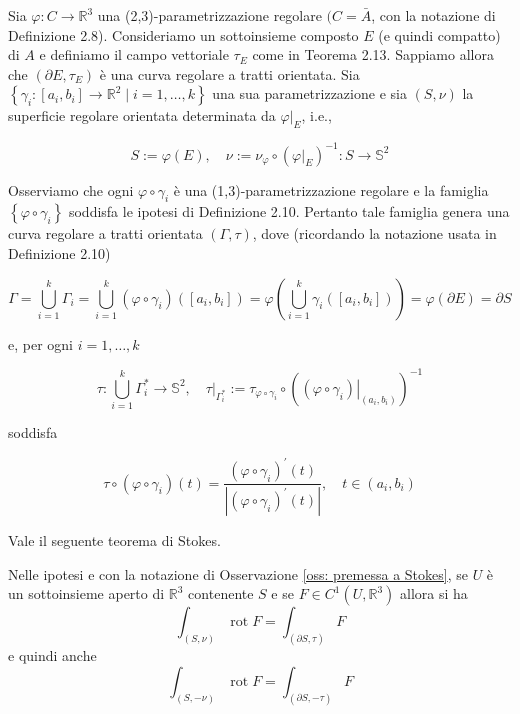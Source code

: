 \begin{oss}\label{oss: premessa a Stokes}
    Sia $\varphi: C \rightarrow \mathbb{R}^{3}$ una (2,3)-parametrizzazione regolare $(C=\bar{A}$, con la notazione di Definizione 2.8). Consideriamo un sottoinsieme composto $E$ (e quindi compatto) di $A$ e definiamo il campo vettoriale $\tau_{E}$ come in Teorema 2.13. Sappiamo allora che $\left(\partial E, \tau_{E}\right)$ è una curva regolare a tratti orientata. Sia $\left\{\gamma_{i}:\left[a_{i}, b_{i}\right] \rightarrow \mathbb{R}^{2} \mid i=1, \ldots, k\right\}$ una sua parametrizzazione e sia $(S, \nu)$ la superficie regolare orientata determinata da $\left.\varphi\right|_{E}$, i.e.,

    \[
    S:=\varphi(E), \quad \nu:=\nu_{\varphi} \circ\left(\left.\varphi\right|_{E}\right)^{-1}: S \rightarrow \mathbb{S}^{2}
    \]

    Osserviamo che ogni $\varphi \circ \gamma_{i}$ è una (1,3)-parametrizzazione regolare e la famiglia $\left\{\varphi \circ \gamma_{i}\right\}$ soddisfa le ipotesi di Definizione 2.10. Pertanto tale famiglia genera una curva regolare a tratti orientata $(\Gamma, \tau)$, dove (ricordando la notazione usata in Definizione 2.10)

    \[
    \Gamma=\bigcup_{i=1}^{k} \Gamma_{i}=\bigcup_{i=1}^{k}\left(\varphi \circ \gamma_{i}\right)\left(\left[a_{i}, b_{i}\right]\right)=\varphi\left(\bigcup_{i=1}^{k} \gamma_{i}\left(\left[a_{i}, b_{i}\right]\right)\right)=\varphi(\partial E)=\partial S
    \]

    e, per ogni $i=1, \ldots, k$

    \[
    \tau: \bigcup_{i=1}^{k} \Gamma_{i}^{*} \rightarrow \mathbb{S}^{2},\left.\quad \tau\right|_{\Gamma_{i}^{*}}:=\tau_{\varphi \circ \gamma_{i}} \circ\left(\left.\left(\varphi \circ \gamma_{i}\right)\right|_{\left(a_{i}, b_{i}\right)}\right)^{-1}
    \]

    soddisfa

    \[
    \tau \circ\left(\varphi \circ \gamma_{i}\right)(t)=\frac{\left(\varphi \circ \gamma_{i}\right)^{\prime}(t)}{\left|\left(\varphi \circ \gamma_{i}\right)^{\prime}(t)\right|}, \quad t \in\left(a_{i}, b_{i}\right)
    \]
\end{oss}

Vale il seguente teorema di Stokes.

\begin{shadedTheorem}[$**|$\,Stokes]\label{thm: 2.14 Stokes}
    Nelle ipotesi e con la notazione di Osservazione \ref{oss: premessa a Stokes}, se $U$ è un sottoinsieme aperto di $\mathbb{R}^{3}$ contenente $S$ e se $F \in C^{1}\left(U, \mathbb{R}^{3}\right)$ allora si ha
    \[
        \int_{(S, \nu)} \operatorname{rot} F=\int_{(\partial S, \tau)} F\tag{$i$}
    \]
    e quindi anche
    \[
        \int_{(S,-\nu)} \operatorname{rot} F=\int_{(\partial S,-\tau)} F\tag{$ii$}
    \]
\end{shadedTheorem}

